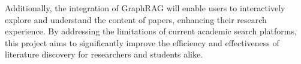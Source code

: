\documentclass[a4paper,12pt]{article}
\begin{document}
Additionally, the integration of GraphRAG will enable users to interactively
explore and understand the content of papers, enhancing their research experience.
By addressing the limitations of current academic search platforms, this project aims
to significantly improve the efficiency and effectiveness of literature discovery
for researchers and students alike.
\newpage

\renewcommand{\refname}{\textit{References}}  %
\printbibliography
\newpage

\newpage
\end{document}
